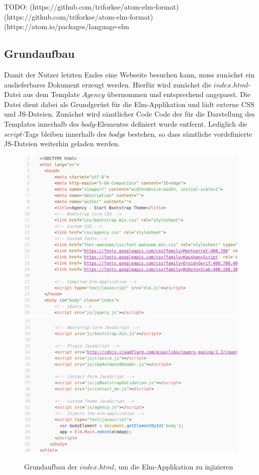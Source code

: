 TODO: (https://github.com/triforkse/atom-elm-format)\\
(https://github.com/triforkse/atom-elm-format)\\
(https://atom.io/packages/language-elm\\

\subsection{Grundaufbau}
\label{sec:Grundaufbau}
Damit der Nutzer letzten Endes eine Webseite besuchen kann, muss zunächst ein auslieferbares Dokument erzeugt werden. Hierfür wird zunächst die $index.html$-Datei aus dem Template $Agency$ übernommen und entsprechend angepasst. Die Datei dient dabei als Grundgerüst für die Elm-Applikation und lädt externe \ac{CSS} und \ac{JS}-Dateien.
Zunächst wird sämtlicher Code Code der für die Darstellung des Templates innerhalb des $body$-Elementes definiert wurde entfernt. Lediglich die $script$-Tags bleiben innerhalb des $body$s bestehen, so dass sämtliche vordefinierte \ac{JS}-Dateien weiterhin geladen werden.
\begin{figure}[p]
\centering
\includegraphics[scale=0.32]{img/index-grundaufbau-1.png}
\includegraphics[scale=0.32]{img/index-grundaufbau-2.png}
\caption{Grundaufbau der $index.html$, um die Elm-Applikation zu injizieren}\label{fig:index-grundaufbau}
\end{figure}

